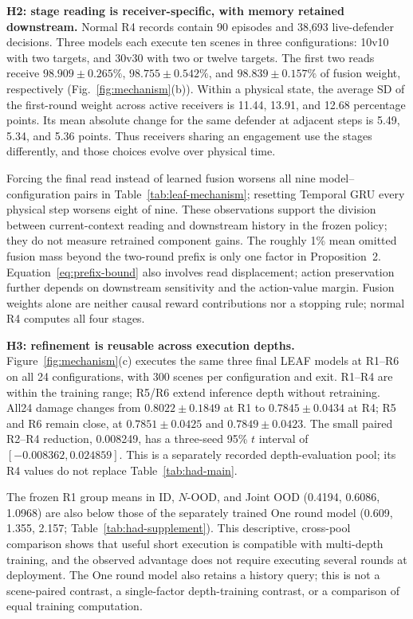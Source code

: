 \noindent\textbf{H2: stage reading is receiver-specific, with memory retained downstream.}
Normal R4 records contain 90 episodes and 38,693 live-defender decisions. Three models each execute ten scenes in three configurations: 10v10 with two targets, and 30v30 with two or twelve targets. The first two reads receive $98.909\pm0.265\%$, $98.755\pm0.542\%$, and $98.839\pm0.157\%$ of fusion weight, respectively (Fig.~\ref{fig:mechanism}(b)). Within a physical state, the average SD of the first-round weight across active receivers is 11.44, 13.91, and 12.68 percentage points. Its mean absolute change for the same defender at adjacent steps is 5.49, 5.34, and 5.36 points. Thus receivers sharing an engagement use the stages differently, and those choices evolve over physical time.

Forcing the final read instead of learned fusion worsens all nine model--configuration pairs in Table~\ref{tab:leaf-mechanism}; resetting Temporal GRU every physical step worsens eight of nine. These observations support the division between current-context reading and downstream history in the frozen policy; they do not measure retrained component gains. The roughly 1\% mean omitted fusion mass beyond the two-round prefix is only one factor in Proposition~2. Equation~\eqref{eq:prefix-bound} also involves read displacement; action preservation further depends on downstream sensitivity and the action-value margin. Fusion weights alone are neither causal reward contributions nor a stopping rule; normal R4 computes all four stages.

\noindent\textbf{H3: refinement is reusable across execution depths.}
Figure~\ref{fig:mechanism}(c) executes the same three final LEAF models at R1--R6 on all 24 configurations, with 300 scenes per configuration and exit. R1--R4 are within the training range; R5/R6 extend inference depth without retraining. All24 damage changes from $0.8022\pm0.1849$ at R1 to $0.7845\pm0.0434$ at R4; R5 and R6 remain close, at $0.7851\pm0.0425$ and $0.7849\pm0.0423$. The small paired R2--R4 reduction, 0.008249, has a three-seed 95\% $t$ interval of $[-0.008362,0.024859]$. This is a separately recorded depth-evaluation pool; its R4 values do not replace Table~\ref{tab:had-main}.

The frozen R1 group means in ID, $N$-OOD, and Joint OOD (0.4194, 0.6086, 1.0968) are also below those of the separately trained One round model (0.609, 1.355, 2.157; Table~\ref{tab:had-supplement}). This descriptive, cross-pool comparison shows that useful short execution is compatible with multi-depth training, and the observed advantage does not require executing several rounds at deployment. The One round model also retains a history query; this is not a scene-paired contrast, a single-factor depth-training contrast, or a comparison of equal training computation.

